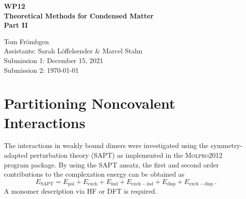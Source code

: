 \documentclass[a4paper,12pt, parskip=half]{scrartcl}
\newcommand{\m}[1]{\mathrm{#1}}
\begin{document}
%
\thispagestyle{empty}

%
\begin{center}
	\begin{LARGE}
		\vspace{50mm}
		\textbf{WP12} \\
		\vspace{15mm}
		\textbf{Theoretical Methods for Condensed Matter} \\
		\vspace{15mm}
		\textbf{Part II} \\
		\vspace{30mm}
	\end{LARGE}
	\begin{large}
		Tom Frömbgen \\
		\vspace{20mm}
		Assistants: Sarah Löffelsender \& Marcel Stahn  \\
		\vspace{10mm}
		Submission 1: December 15, 2021 \\
		\vspace{5mm}
		Submission 2:  \today
	\end{large}
\end{center}

%
%
\newpage
{}
\section{Partitioning Noncovalent Interactions}
%
The interactions in weakly bound dimers were investigated using the symmetry-adapted perturbation theory\autocite{sapt} (SAPT) as implemented in the \textsc{Molpro2012} program package\autocite[]{molpro2012-brief}. By using the SAPT ansatz, the first and second order contributions to the complexation energy can be obtained as
%
\begin{equation}
	E_\m{SAPT} = E_\m{pol} + E_\m{exch} + E_\m{ind} + E_\m{exch-ind} + E_\m{disp} + E_\m{exch-disp}~.
\end{equation}
%
A monomer description via HF or DFT is required.
%
\end{document}
